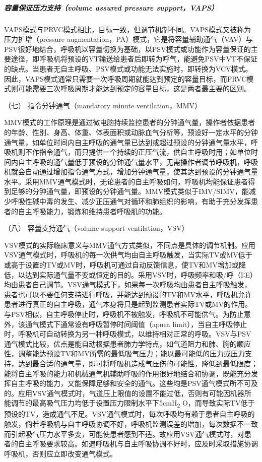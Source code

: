 \subparagraph{容量保证压力支持（volume assured pressure support，VAPS）}

VAPS模式与PRVC模式相比，目标一致，但调节机制不同。VAPS模式又被称为压力扩增（pressure
augmentation，PA）模式，它是将容量辅助通气（VAV）与PSV很好地结合，呼吸机以容量切换为基础，以PSV模式或功能作为容量保证的主要途径，即呼吸机将预设的VT输送给患者后即转为呼气，能避免PSV中VT不保证的缺点。当患者无自主呼吸、PSV模式或功能无法实施时，即转换为VCV模式。因此，VAPS模式通常只需要一次呼吸周期就能达到预定的容量目标，而PRVC模式则可能需要三次呼吸周期才能达到预定的容量目标，这是两者最主要的区别。

\hypertarget{text00368.htmlux5cux23CHP16-3-2-1-7}{}
（七） 指令分钟通气（mandatory minute ventilation，MMV）

MMV模式的工作原理是通过微电脑持续监控患者的分钟通气量，操作者依据患者的年龄、性别、身高、体重、体表面积或动脉血气分析等，预设好一定水平的分钟通气量，如单位时间内自主呼吸的通气量已达到或超过预设的分钟通气量水平，呼吸机则不作指令通气，而只提供一个持续的正压气流，供自主呼吸时用；如单位时间内自主呼吸的通气量低于预设的分钟通气量水平，无需操作者调节呼吸机，呼吸机就会自动通过增加指令通气方式，增加分钟通气量，使其达到预设的分钟通气量水平。采用MMV通气模式时，无论患者的自主呼吸如何，呼吸机均能保证患者得到足够的分钟通气量，即预设的分钟通气量。MMV模式类似于IMV/SIMV，能减少呼吸性碱中毒的发生、减少正压通气对循环和肺组织的影响，有助于充分发挥患者的自主呼吸能力，锻炼和维持患者呼吸肌的功能。

\hypertarget{text00368.htmlux5cux23CHP16-3-2-1-8}{}
（八） 容量支持通气（volume support ventilation，VSV）

VSV模式的实际临床意义与MMV通气方式类似，不同点是具体的调节机制。应用VSV通气模式时，呼吸机的每一次供气均由自主呼吸触发，当实际TV或MV低于或高于设置的TV或MV时，呼吸机可通过自动反馈信息，使TV和MV增加或降低，以达到实际通气量不变或恒定的目的。采用VSV时，呼吸频率和吸/呼（I∶E）均由患者自己调节。VSV通气模式下，如果每一次呼吸均由患者自主呼吸触发，患者也可以不要任何支持进行呼吸，并能达到预设的TV和MV水平，呼吸机允许患者进行真正的自主呼吸，通气本身将只是起到监测患者实际TV或MV的作用。与PSV相似，自主呼吸停止时，呼吸机不被触发，呼吸机不可能供气。为防止意外，该通气模式下通常设有呼吸暂停时间阈值（apnea
limit），当自主呼吸停止时，呼吸机可自动转换为另一种呼吸模式，以维持相对正常的呼吸。VSV与PSV通气模式比较，优点是能自动根据患者肺力学特点，如气道阻力和肺、胸的顺应性，调整能达预设TV和MV所需的最低吸气压力；能以最可能低的压力或压力支持，达到最合适的通气量，即可将呼吸机造成气压伤的可能性，降低到最低限度；能将自主呼吸的能力和机械通气机辅助呼吸的作用很好地结合和协调，既能充分发挥自主呼吸的能力，又能保障足够和安全的通气。这些均是PSV通气模式所不可及的。应用VSV通气模式时，气道压上限值的设置不能过低，否则有可能因机器所能调节的最高吸气压力均低于设置压力限制水平下5cmH\textsubscript{2}
O，而导致实际TV低于预设的TV，造成通气不足。VSV通气模式时，每次呼吸均有赖于患者自主呼吸的触发，倘若呼吸机与自主呼吸协调不好，呼吸机监测误差的增加，每次数据不一致而引起吸气压力水平多变，可能使患者感到不适。故应用VSV通气模式时，对患者的自主呼吸要求较高。如遇呼吸机与自主呼吸协调不好时，应及时采取措施协调呼吸机，否则应立即改变通气模式。


